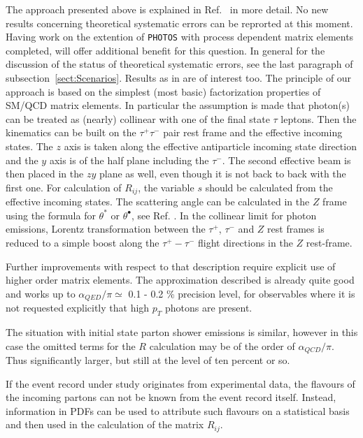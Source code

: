 \documentclass[]{Tauola_interface_design}
\begin{document}
The approach presented above  is explained in Ref.~\cite{Golonka:2003xt} in
 more detail. No new results concerning 
 theoretical systematic errors can be reprorted at this moment.
Having work on the extention of {\tt PHOTOS} \cite{photosC++} 
with process dependent matrix elements completed,
will offer additional benefit for this question. In general for the discussion
of the status of theoretical systematic errors, see the last
paragraph of subsection~\ref{sect:Scenarios}. Results as in \cite{Richardson:2010gz} are of interest too.
The principle of our approach
is based on the simplest (most basic) factorization properties of SM/QCD matrix elements. 
In particular the assumption is made that   photon(s) can be treated as (nearly) collinear with one of the final state 
$\tau$ leptons. Then the kinematics can be built on the 
$\tau^+ \tau^-$ pair rest frame and the effective  incoming states. The 
 $z$ axis is taken along the effective  
 antiparticle incoming state direction and the $y$ axis is of the half plane  including the $\tau^-$. 
The second effective beam is then placed in the $zy$ plane as well, even though it is not back to back
with the first one.
 For calculation of $R_{ij}$, the  variable $s$ should be calculated from the effective  incoming states.
The scattering angle can be calculated in the $Z$ frame using the formula for $\theta^*$ or $\theta^\bullet$, see Ref. \cite{Was:1989ce}. 
In the collinear limit for photon emissions,  Lorentz transformation between the $\tau^+$, $\tau^-$ and $Z$ rest
frames is reduced to a simple  boost along the $\tau^+-\tau^-$ flight directions in the $Z$ rest-frame.

Further improvements with respect to that description
require explicit use of higher order matrix elements. The approximation described is already quite good
and  works up to $\alpha_{QED} / \pi \simeq$ 0.1 - 0.2 \% precision level,
for observables where it is not requested explicitly that high $p_T$ photons are present.

The situation with initial state parton shower emissions is similar, however in this case
the omitted terms for the $R$ calculation may be of the order of $\alpha_{QCD} / \pi$. Thus significantly larger, 
but still at the level of ten  percent or so.

If the event record under 
study originates from experimental data, the flavours of the incoming partons
 can not be known from the event record itself. 
Instead, information in PDFs can be used to attribute such flavours on a
statistical basis and then used in the calculation of the matrix $R_{ij}$. 
\end{document}
